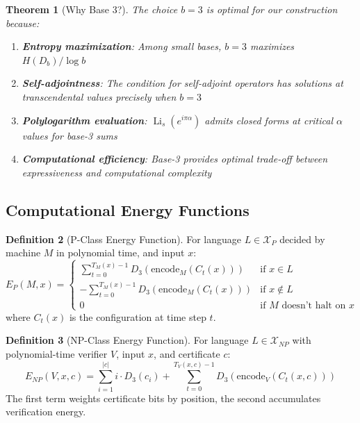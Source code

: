 \documentclass[12pt]{article}
\theoremstyle{plain}
\newtheorem{theorem}{Theorem}[section]
\theoremstyle{definition}
\newtheorem{definition}[theorem]{Definition}
\DeclareMathOperator{\Li}{Li}
\newcommand{\digitalsum}{D}
\newcommand{\encode}{\text{encode}}
\begin{document}
\begin{theorem}[Why Base 3?]
\label{thm:base3}
The choice $b = 3$ is optimal for our construction because:
\begin{enumerate}
\item \textbf{Entropy maximization}: Among small bases, $b = 3$ maximizes $H(\digitalsum_b)/\log b$~\cite{allouche1992digital}
\item \textbf{Self-adjointness}: The condition for self-adjoint operators has solutions at transcendental values precisely when $b = 3$
\item \textbf{Polylogarithm evaluation}: $\Li_s(e^{i\pi\alpha})$ admits closed forms at critical $\alpha$ values for base-3 sums~\cite{zagier1991polylogarithms}
\item \textbf{Computational efficiency}: Base-3 provides optimal trade-off between expressiveness and computational complexity
\end{enumerate}
\end{theorem}

\subsection{Computational Energy Functions}

\begin{definition}[P-Class Energy Function]
\label{def:p_energy}
For language $L \in \mathcal{X}_P$ decided by machine $M$ in polynomial time, and input $x$:
\begin{equation}
E_P(M, x) = \begin{cases}
\sum_{t=0}^{T_M(x)-1} \digitalsum_3(\encode_M(C_t(x))) & \text{if } x \in L \\
-\sum_{t=0}^{T_M(x)-1} \digitalsum_3(\encode_M(C_t(x))) & \text{if } x \notin L \\
0 & \text{if } M \text{ doesn't halt on } x
\end{cases}
\end{equation}
where $C_t(x)$ is the configuration at time step $t$.
\end{definition}

\begin{definition}[NP-Class Energy Function]
\label{def:np_energy}
For language $L \in \mathcal{X}_{NP}$ with polynomial-time verifier $V$, input $x$, and certificate $c$:
\begin{equation}
E_{NP}(V, x, c) = \sum_{i=1}^{|c|} i \cdot \digitalsum_3(c_i) + \sum_{t=0}^{T_V(x,c)-1} \digitalsum_3(\encode_V(C_t(x, c)))
\end{equation}
The first term weights certificate bits by position, the second accumulates verification energy.
\end{definition}
\end{document}
